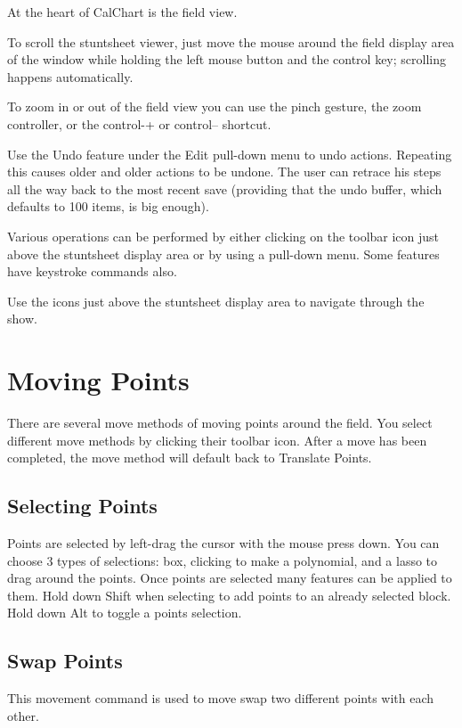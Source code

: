 At the heart of CalChart is the field view.

To scroll the stuntsheet viewer, just move the mouse around the field display area of the window while holding the left mouse button and the control key; scrolling happens automatically.

To zoom in or out of the field view you can use the pinch gesture, the zoom controller, or the control-+ or control-- shortcut.

Use the Undo feature under the Edit pull-down menu to undo actions.  Repeating this causes older and older actions to be undone.  The user can retrace his steps all the way back to the most recent save (providing that the undo buffer, which defaults to 100 items, is big enough).

Various operations can be performed by either clicking on the toolbar icon just above the stuntsheet display area or by using a pull-down menu.  Some features have keystroke commands also.

Use the icons just above the stuntsheet display area to navigate through the show.

\section{Moving Points}\label{movement}

There are several move methods of moving points around the field.  You select different move methods by clicking their toolbar icon.  After a move has been completed, the move method will default back to Translate Points.

\subsection{Selecting Points}\label{selectingpoints}

Points are selected by left-drag the cursor with the mouse press down.  You can choose 3 types of selections: box, clicking to make a polynomial, and a lasso to drag around the points.  Once points are selected many features can be applied to them. Hold down Shift when selecting to add points to an already selected block. Hold down Alt to toggle a points selection.

\subsection{Swap Points}\label{swappoints}

This movement command is used to move swap two different points with each other.

